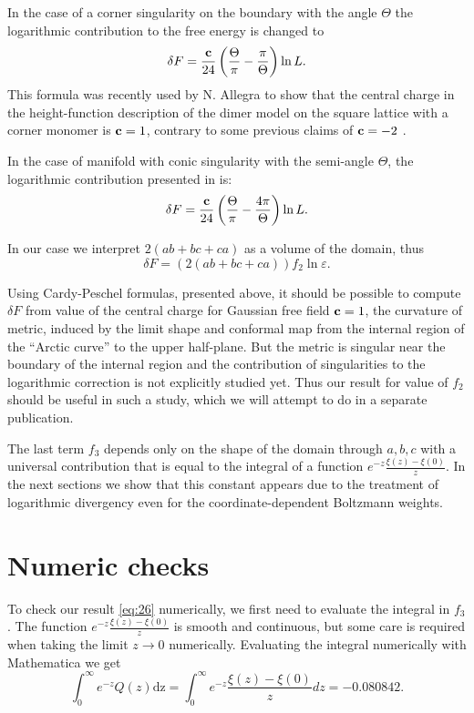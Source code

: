 \documentclass{article}
\newcommand{\dz}{\mathrm{dz}}
\begin{document}
In the case of a corner singularity on the boundary with the angle
$\Theta$ the logarithmic contribution to the free energy is changed to
\begin{equation}
  \label{eq:86}
  \delta F = \frac{{\bf c}}{24}\left(\frac{\Theta}{\pi}-\frac{\pi}{\Theta}\right) \ln L.
\end{equation}
This formula was recently used by N. Allegra \cite{allegra2015exact} to show that the central charge
in the height-function description of the dimer model on the square lattice with a corner monomer is
${\bf c}=1$, contrary to some previous claims of ${\bf c}=-2$ \cite{morin2016integrability}.

In the case of manifold with conic singularity with the semi-angle
$\Theta$, the logarithmic contribution presented in \cite{cardy1988finite} is:
\begin{equation}
  \label{eq:91}
  \delta F = \frac{{\bf c}}{24}\left(\frac{\Theta}{\pi}-\frac{4\pi}{\Theta}\right) \ln L.
\end{equation}


In our case we interpret $2(ab+bc+ca)$ as a volume of the domain, thus
\begin{equation}
  \label{eq:33}
  \delta F = \left(2(ab+bc+ca)\right) f_{2}\ln\varepsilon.
\end{equation}

Using Cardy-Peschel formulas, presented above, it should be possible to compute $\delta F$ from
value of the central charge for Gaussian free field ${\bf c}=1$, the curvature of metric, induced by
the limit shape and conformal map from the internal region of the ``Arctic curve'' to the upper
half-plane. But the metric is singular near the boundary of the internal region
\cite{kenyon2007limit} and the contribution of singularities to the logarithmic correction is not
explicitly studied yet. Thus our result for value of $f_2$ should be useful in such a study, which
we will attempt to do in a separate publication.

The last term $f_{3}$ depends only on the shape of the domain through
$a,b,c$ with a universal contribution that is equal to the integral of
a function $e^{-z}\frac{\xi(z)-\xi(0)}{z}$. In the next sections we
show that this constant appears due to the treatment of logarithmic
divergency even for the coordinate-dependent Boltzmann weights. 

\section{Numeric checks}
\label{sec:numeric-checks}
To check our result \eqref{eq:26} numerically, we first need to evaluate the integral in $f_{3}$.
The function $e^{-z}\frac{\xi(z)-\xi(0)}{z}$ is smooth and continuous, but some care is required when taking the
limit $z\to 0$ numerically. Evaluating the integral numerically with Mathematica we get
\begin{equation}
  \label{eq:2}
  \int_{0}^{\infty}e^{-z}Q(z)\dz=\int_{0}^{\infty}e^{-z}\frac{\xi(z)-\xi(0)}{z} dz = -0.080842.%
\end{equation}
\end{document}
